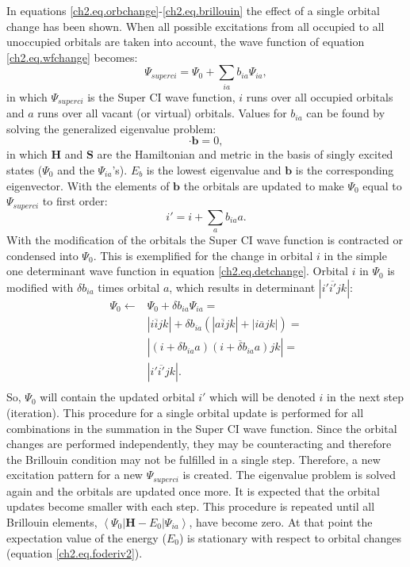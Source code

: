 In equations \ref{ch2.eq.orbchange}-\ref{ch2.eq.brillouin} the effect of a single orbital change has been shown. When all possible excitations from all occupied to all unoccupied orbitals are taken into account, the wave function of equation \ref{ch2.eq.wfchange} becomes:
\begin{equation}
\Psi_{superci} = \Psi_0 + \sum_{ia} b_{ia} \Psi_{ia},
\label{ch2.eq.superci}
\end{equation}
in which $\Psi_{superci}$ is the Super CI wave function, $i$ runs over all occupied orbitals and $a$ runs over all vacant (or virtual) orbitals. Values for $b_{ia}$ can be found by solving the generalized eigenvalue problem:
\begin{equation}
[\mathbf{H}-E_b\mathbf{S}] \cdot \mathbf{b} = 0,
\label{ch2.eq.geig}
\end{equation}
in which $\mathbf{H}$ and $\mathbf{S}$ are the Hamiltonian and metric in the basis of singly excited states ($\Psi_0$ and the $\Psi_{ia}$'s). $E_b$ is the lowest eigenvalue and $\mathbf{b}$ is the corresponding eigenvector. With the elements of $\mathbf{b}$ the orbitals are updated to make $\Psi_0$ equal to $\Psi_{superci}$ to first order:
\begin{equation}
i' = i + \sum_{a} b_{ia} a.
\label{ch2.eq.orbupd}
\end{equation}
With the modification of the orbitals the Super CI wave function is contracted or condensed into $\Psi_0$. This is exemplified for the change in orbital $i$ in the simple one determinant wave function in equation \ref{ch2.eq.detchange}. Orbital $i$ in $\Psi_0$ is modified with $\delta b_{ia}$ times orbital $a$, which results in determinant $|i'\overline{i'}jk |$:
\begin{equation}
\begin{split}
\Psi_{0} \leftarrow & \Psi_{0} + \delta b_{ia} \Psi_{ia} = \\
&|i\overline{i}jk| + \delta b_{ia}(|a\overline{i}jk| + |i\overline{a}jk|) = \\
&|(i + \delta b_{ia}a)\overline{(i + \delta b_{ia}a)}jk| = \\
&|i'\overline{i'}jk |.\\
\end{split}
\label{ch2.eq.condense}
\end{equation}
So, $\Psi_0$ will contain the updated orbital $i'$ which will be denoted $i$ in the next step (iteration). This procedure for a single orbital update is performed for all combinations in the summation in the Super CI wave function. Since the orbital changes are performed independently, they may be counteracting and therefore the Brillouin condition may not be fulfilled in a single step. Therefore, a new excitation pattern for a new $\Psi_{superci}$ is created. The eigenvalue problem is solved again and the orbitals are updated once more. It is expected that the orbital updates become smaller with each step. This procedure is repeated until all Brillouin elements, $\left < \Psi_0 | \mathbf{H} - E_0 | \Psi_{ia} \right >$, have become zero. At that point the expectation value of the energy ($E_0$) is stationary with respect to orbital changes (equation \ref{ch2.eq.foderiv2}).

